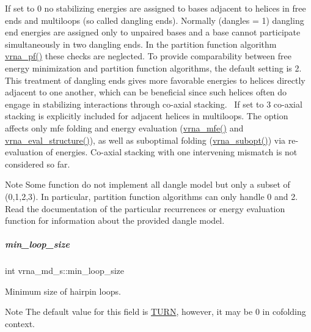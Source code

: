 If set to 0 no stabilizing energies are assigned to bases adjacent to helices in free ends and multiloops (so called dangling ends). Normally (dangles = 1) dangling end energies are assigned only to unpaired bases and a base cannot participate simultaneously in two dangling ends. In the partition function algorithm \hyperlink{group__pf__fold_ga29e256d688ad221b78d37f427e0e99bc}{vrna\+\_\+pf()} these checks are neglected. To provide comparability between free energy minimization and partition function algorithms, the default setting is 2. This treatment of dangling ends gives more favorable energies to helices directly adjacent to one another, which can be beneficial since such helices often do engage in stabilizing interactions through co-\/axial stacking.~\newline
If set to 3 co-\/axial stacking is explicitly included for adjacent helices in multiloops. The option affects only mfe folding and energy evaluation (\hyperlink{group__mfe__fold_gabd3b147371ccf25c577f88bbbaf159fd}{vrna\+\_\+mfe()} and \hyperlink{group__eval_ga58f199f1438d794a265f3b27fc8ea631}{vrna\+\_\+eval\+\_\+structure()}), as well as suboptimal folding (\hyperlink{group__subopt__wuchty_ga0f11d738fb8c8b1885a90c11c8931ff6}{vrna\+\_\+subopt()}) via re-\/evaluation of energies. Co-\/axial stacking with one intervening mismatch is not considered so far. \begin{DoxyNote}{Note}
Some function do not implement all dangle model but only a subset of (0,1,2,3). In particular, partition function algorithms can only handle 0 and 2. Read the documentation of the particular recurrences or energy evaluation function for information about the provided dangle model. 
\end{DoxyNote}
\mbox{\label{group__model__details_a9ed7ba42fcc46915c5c0c524f3d255f5}} 
\subparagraph{\texorpdfstring{min\+\_\+loop\+\_\+size}{min\_loop\_size}}
{\footnotesize\ttfamily int vrna\+\_\+md\+\_\+s\+::min\+\_\+loop\+\_\+size}



Minimum size of hairpin loops. 

\begin{DoxyNote}{Note}
The default value for this field is \hyperlink{energy__const_8h_ae646250fd59311356c7e5722a81c3a96}{T\+U\+RN}, however, it may be 0 in cofolding context. 
\end{DoxyNote}


